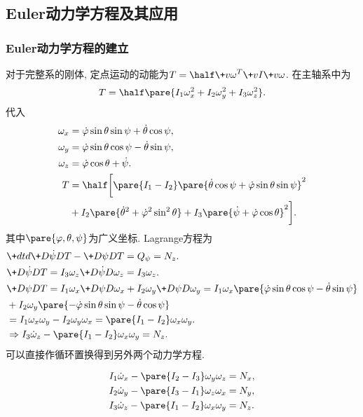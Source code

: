 \documentclass[../LectureNotes.tex]{subfiles}
\begin{document}


\subsection{Euler动力学方程及其应用} %
\label{sub:euler动力学方程及其应用}

\subsubsection{Euler动力学方程的建立} %
\label{ssub:euler动力学方程的建立}

对于完整系的刚体, 定点运动的动能为$\displaystyle T = \half \+v\omega^T \+vI \+v\omega$. 在主轴系中为
\[ T = \half \pare{I_1 \omega_x^2 + I_2\omega_y^2 + I_3\omega_z^2}. \]
代入
\begin{align*}
    \omega_x &= \dot{\varphi}\sin\theta\sin\psi + \dot\theta\cos\psi, \\
    \omega_y &= \dot\varphi\sin\theta\cos\psi - \dot\theta\sin\psi, \\
    \omega_z &= \dot\varphi\cos\theta + \dot\psi. \\
    T &= \half\bigg[\pare{I_1 - I_2}\pare{\dot\theta\cos\psi + \dot\varphi\sin\theta\sin\psi}^2 \\ &+ I_2\pare{\dot\theta^2 + \dot\varphi^2\sin^2\theta} + I_3\pare{\dot\psi + \dot\varphi\cos\theta}^2\bigg].
\end{align*}
其中$\pare{\varphi,\theta,\psi}$为广义坐标. Lagrange方程为
\begin{align*}
    & \+dtd{} \+D{\dot\psi}D{T} - \+D\psi DT = Q_\psi = N_z. \\
    & \+D{\dot\psi}DT = I_3\omega_z \+D{\dot\psi}D{\omega_z} = I_3\omega_z. \\
    & \+D\psi DT = I_1\omega_x \+D\psi D{\omega_x} + I_2\omega_y \+D\psi D{\omega_y} = I_1\omega_x\pare{\dot\varphi\sin\theta\cos\psi - \dot\theta\sin\psi} \\
    &+ I_2\omega_y\pare{-\dot\varphi\sin\theta\sin\psi - \dot\theta\cos\psi} \\
    &= I_1\omega_x \omega_y - I_2\omega_y\omega_x = \pare{I_1 - I_2}\omega_x \omega_y. \\
    &\Rightarrow I_3 \dot{\omega}_z - \pare{I_1 - I_2}\omega_x\omega_y = N_z.
\end{align*}
可以直接作循环置换得到另外两个动力学方程.
\begin{finale}
    \begin{theorem}[Euler动力学方程]
        \begin{align*}
    I_1\dot{\omega}_x - \pare{I_2 - I_3}\omega_y\omega_z &= N_x, \\
    I_2\dot{\omega}_y - \pare{I_3 - I_1}\omega_z\omega_x &= N_y, \\
    I_3\dot{\omega}_z - \pare{I_1 - I_2}\omega_x\omega_y &= N_z.
\end{align*}
    \end{theorem}
\end{finale}
\end{document}
